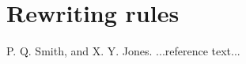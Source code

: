 \documentclass[preprint]{sigplanconf}
\begin{document}
\section{Rewriting rules}

%
%
%
%





\begin{thebibliography}{}
\softraggedright

P. Q. Smith, and X. Y. Jones. ...reference text...

\end{thebibliography}
\end{document}

